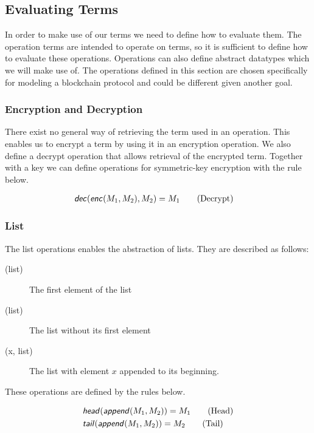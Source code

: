 \subsection{Evaluating Terms}
In order to make use of our terms we need to define how to evaluate them.
The operation terms are intended to operate on terms, so it is sufficient to define how to evaluate these operations.
Operations can also define abstract datatypes which we will make use of.
The operations defined in this section are chosen specifically for modeling a blockchain protocol and could be different given another goal.



\subsubsection{Encryption and Decryption}
There exist no general way of retrieving the term used in an operation.
This enables us to encrypt a term by using it in an encryption operation.
We also define a decrypt operation that allows retrieval of the encrypted term.
Together with a key we can define operations for symmetric-key encryption with the rule below.

\begin{align*}
    &\text{\sffamily \textit{dec}\normalfont}(\text{\sffamily \textit{enc}\normalfont}(M_1, M_2),M_2) = M_1 \tag{Decrypt}
\end{align*}

\FloatBarrier

\subsubsection{List}
The list operations enables the abstraction of lists.
They are described as follows:

\begin{description}
	\item[(list)] The first element of the list
	\item[(list)] The list without its first element
	\item[(x, list)] The list with element $x$ appended to its beginning.
\end{description}

These operations are defined by the rules below.

\begin{align*}
	&\text{\sffamily \textit{head}\normalfont}(\text{\sffamily \textit{append}\normalfont}(M_1, M_2)) = M_1 \tag{Head} \\
	&\text{\sffamily \textit{tail}\normalfont}(\text{\sffamily \textit{append}\normalfont}(M_1, M_2)) = M_2 \tag{Tail}
\end{align*}

